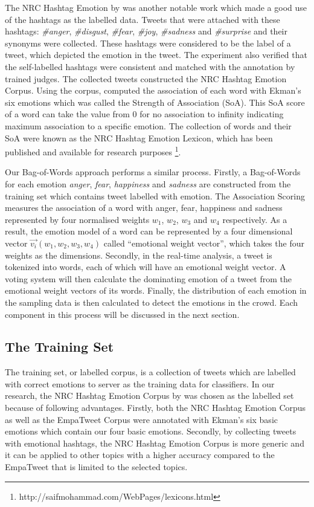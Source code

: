 The NRC Hashtag Emotion by \citep{mohammad2014using} was another notable work which made a good use of the hashtags as the labelled data. Tweets that were attached with these hashtags: \textit{\#anger}, \textit{\#disgust}, \textit{\#fear}, \textit{\#joy}, \textit{\#sadness} and \textit{\#surprise} and their synonyms were collected. These hashtags were considered to be the label of a tweet, which depicted the emotion in the tweet. The experiment also verified that the self-labelled hashtags were consistent and matched with the annotation by trained judges. The collected tweets constructed the NRC Hashtag Emotion Corpus. Using the corpus, \citet{mohammad2014using} computed the association of each word with Ekman's six emotions which was called the Strength of Association (SoA). This SoA score of a word can take the value from 0 for no association to infinity indicating maximum association to a specific emotion. The collection of words and their SoA were known as the NRC Hashtag Emotion Lexicon, which has been published and available for research purposes \footnote{http://saifmohammad.com/WebPages/lexicons.html}.

Our Bag-of-Words approach performs a similar process. Firstly, a Bag-of-Words for each emotion \textit{anger}, \textit{fear}, \textit{happiness} and \textit{sadness} are constructed from the training set which contains tweet labelled with emotion. The Association Scoring measures the association of a word with anger, fear, happiness and sadness represented by four normalised weights \(w_1\), \(w_2\), \(w_3\) and \(w_4\) respectively. As a result, the emotion model of a word can be represented by a four dimensional vector \(\vec{v_i}(w_1, w_2, w_3, w_4)\) called ``emotional weight vector'', which takes the four weights as the dimensions. Secondly, in the real-time analysis, a tweet is tokenized into words, each of which will have an emotional weight vector. A voting system will then calculate the dominating emotion of a tweet from the emotional weight vectors of its words. Finally, the distribution of each emotion in the sampling data is then calculated to detect the emotions in the crowd. Each component in this process will be discussed in the next section.

\subsection{The Training Set}
The training set, or labelled corpus, is a collection of tweets which are labelled with correct emotions to server as the training data for classifiers. In our research, the NRC Hashtag Emotion Corpus by \citet{mohammad2014using} was chosen as the labelled set because of following advantages. Firstly, both the NRC Hashtag Emotion Corpus as well as the EmpaTweet Corpus were annotated with Ekman's six basic emotions which contain our four basic emotions. Secondly, by collecting tweets with emotional hashtags, the NRC Hashtag Emotion Corpus is more generic and it can be applied to other topics with a higher accuracy compared to the EmpaTweet that is limited to the selected topics.

